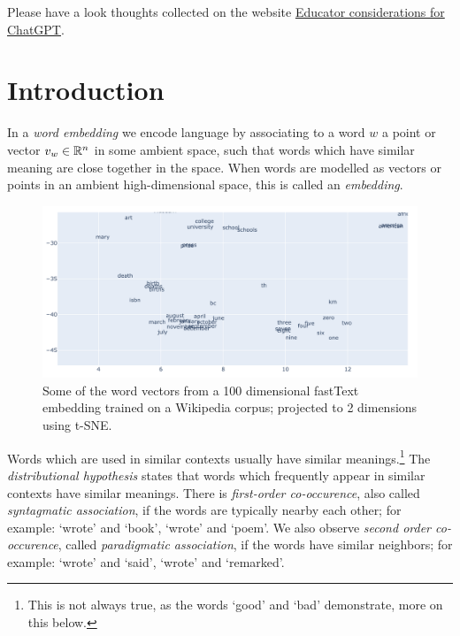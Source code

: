 \documentclass[11pt, a4paper]{amsart}
\begin{document}
Please have a look thoughts collected on the website \href{https://platform.openai.com/docs/chatgpt-education}{Educator considerations for ChatGPT}.

\clearpage
\section{Introduction}
\label{sec:intro}

In a \emph{word embedding} we encode language by associating to a word $w$ a point or vector $v_{w} \in \mathbb{R}^{n}$ in some ambient space, such that words which have similar meaning are close together in the space.
When words are modelled as vectors or points in an ambient high-dimensional space, this is called an \emph{embedding}.

\begin{figure}[H]
    \centering
    \includegraphics[width=\linewidth]{pictures/fastText_tSNE_screenshot.png}
    \caption{Some of the word vectors from a 100 dimensional fastText embedding trained on a Wikipedia corpus; projected to 2 dimensions using t-SNE.}
    \label{fig:fastText_tSNE}
\end{figure}

Words which are used in similar contexts usually have similar meanings.\footnote{This is not always true, as the words `good' and `bad' demonstrate, more on this below.}
The \emph{distributional hypothesis} states that words which frequently appear in similar contexts have similar meanings.
There is \emph{first-order co-occurence}, also called \emph{syntagmatic association}, if the words are typically nearby each other; for example: `wrote' and `book', `wrote' and `poem'.
We also observe \emph{second order co-occurence}, called \emph{paradigmatic association}, if the words have similar neighbors; for example: `wrote' and `said', `wrote' and `remarked'.
\end{document}
